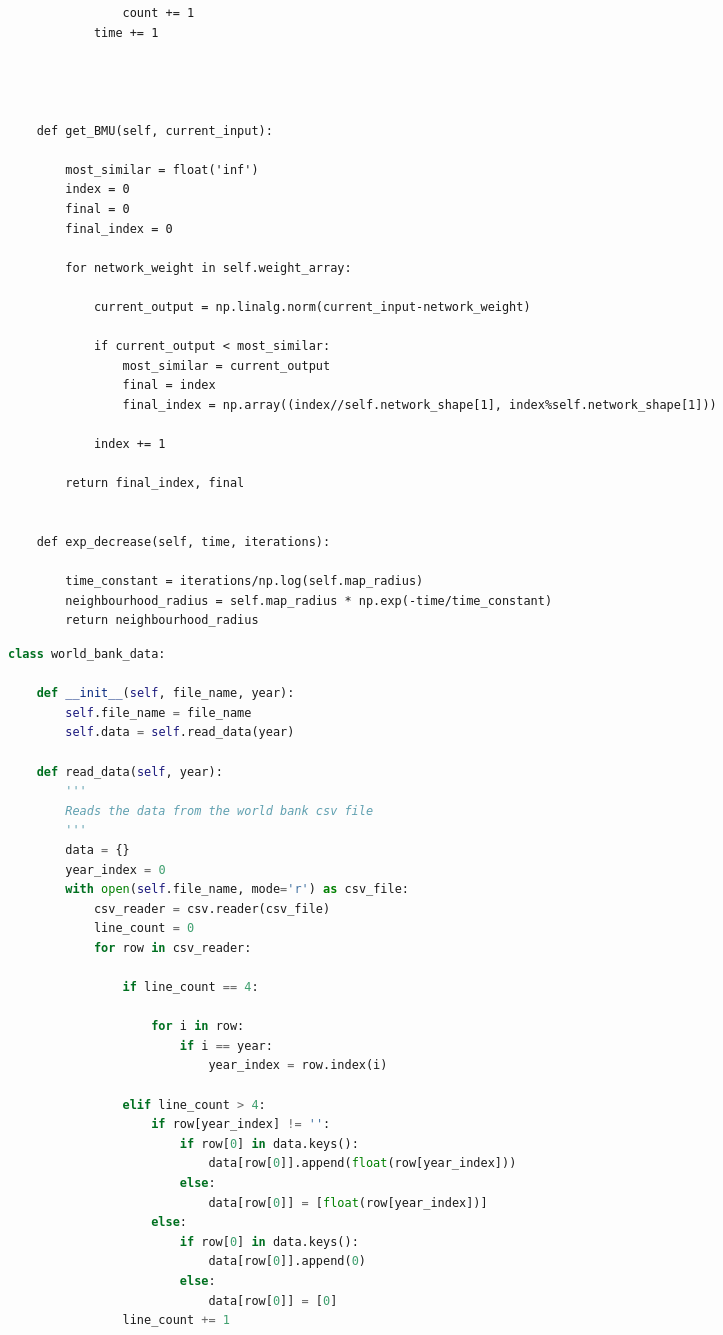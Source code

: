 \documentclass[12pt]{report} %
\begin{document}
\begin{changemargin}{-1cm}{-1cm}
\begin{lstlisting}
                count += 1
            time += 1




    def get_BMU(self, current_input):

        most_similar = float('inf')
        index = 0
        final = 0
        final_index = 0

        for network_weight in self.weight_array:

            current_output = np.linalg.norm(current_input-network_weight)

            if current_output < most_similar:
                most_similar = current_output
                final = index
                final_index = np.array((index//self.network_shape[1], index%self.network_shape[1]))

            index += 1
        
        return final_index, final


    def exp_decrease(self, time, iterations):

        time_constant = iterations/np.log(self.map_radius)
        neighbourhood_radius = self.map_radius * np.exp(-time/time_constant)
        return neighbourhood_radius
\end{lstlisting}

\newpage

\begin{lstlisting}[language=python, caption= {Class containing world bank data read as a CSV file, and normalized between 0 and 1}, captionpos=b]
class world_bank_data:

    def __init__(self, file_name, year):
        self.file_name = file_name
        self.data = self.read_data(year)

    def read_data(self, year):
        '''
        Reads the data from the world bank csv file
        '''
        data = {}
        year_index = 0
        with open(self.file_name, mode='r') as csv_file:
            csv_reader = csv.reader(csv_file)
            line_count = 0
            for row in csv_reader:

                if line_count == 4:
                    
                    for i in row:
                        if i == year:
                            year_index = row.index(i)

                elif line_count > 4:
                    if row[year_index] != '':
                        if row[0] in data.keys():
                            data[row[0]].append(float(row[year_index]))
                        else:
                            data[row[0]] = [float(row[year_index])]
                    else:
                        if row[0] in data.keys():
                            data[row[0]].append(0)
                        else:
                            data[row[0]] = [0]
                line_count += 1


\end{lstlisting}
\end{changemargin}
\end{document}
